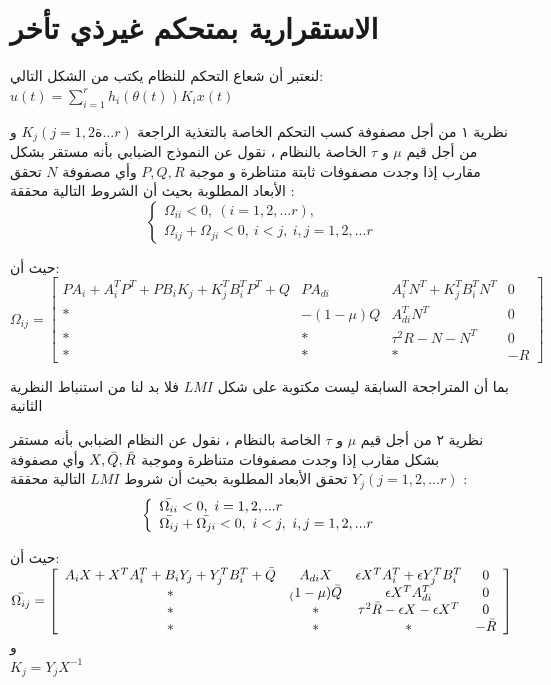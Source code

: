 \documentclass[dvipsnames,mathserif]{beamer}
\begin{document}
{\section{الاستقرارية بمتحكم غيرذي تأخر}
\begin{frame}
\footnotesize
لنعتبر أن شعاع التحكم للنظام يكتب من الشكل التالي:    $u(t)=\sum_{i=1}^{r} h_{i}(\theta(t))K_{i}x(t)$
\begin{block}{نظرية ١}
من أجل مصفوفة كسب التحكم الخاصة بالتغذية الراجعة  $K_{j}(j=1,2ة...r)$ و
من أجل قيم $\mu$ و $\tau$ الخاصة بالنظام  ، نقول عن النموذج  الضبابي بأنه مستقر بشكل مقارب  إذا وجدت مصفوفات ثابتة متناظرة و موجبة $P,Q,R$ وأي مصفوفة $N$ تحقق الأبعاد المطلوبة بحيث أن الشروط التالية محققة :
\begin{equation*}
\left\{\begin{array}{l}
{\Omega_{ii}}< 0,\   (i=1,2,...r) , \\
{\Omega_{ij}}+{\Omega_{ji}}<0,\ i<j ,\ i,j=1,2,...r
\end{array}\right.
\end{equation*}
\end{block}
حيث أن:
\tiny
\begin{equation*}
\Omega_{ij}= \left[\begin{array}{cccc}
PA_i+A_i^TP^T+PB_iK_j+K_j^TB_i^TP^T+Q& PA_{di}& A_i^TN^T+K_j^TB_i^TN^T & 0 \\ *& -(1-\mu)Q& A_{di}^TN^T & 0\\ *&*&\tau^2R-N-N^T & 0\\ * &* &* &-R 
   \end{array}\right]
\end{equation*}
\end{frame}
\begin{frame}
\footnotesize
بما أن المتراجحة السابقة ليست مكتوبة على شكل $LMI$
فلا بد لنا من استنباط النظرية الثانية 
\begin{block}{نظرية ٢}
من أجل قيم $\mu$ و $\tau$ الخاصة بالنظام ، نقول عن النظام  الضبابي  بأنه مستقر بشكل مقارب  إذا وجدت مصفوفات متناظرة وموجبة $X,\Bar{Q},\Bar{R}$ وأي مصفوفة $Y_j(j=1,2,...r)$ تحقق الأبعاد المطلوبة بحيث أن شروط $LMI$ التالية محققة :
\begin{equation*}
\left\{\begin{array}{l}
\Bar{\Omega_{ii}}< 0,\ i=1,2,...r \\
\Bar{\Omega_{ij}}+\Bar{\Omega_{ji}}<0,\ i<j , \ i,j=1,2,...r
\end{array}\right.
\end{equation*}
\end{block}
حيث أن:\\
$ \Bar{\Omega_{ij}}=\left[\begin{array}{cccc}
A_iX+X^TA_i^T+B_iY_j+Y_j^TB_i^T+\Bar{Q}& A_{di}X& \epsilon X^T A_i^T+\epsilon Y_j^TB_i^T & 0 \\ *& _(1-\mu)\Bar{Q}& \epsilon X^T A_{di}^T & 0\\ *&*&\tau^2\Bar{R}-\epsilon X-\epsilon X^T & 0\\ *&*&*&-\Bar{R}
   \end{array}\right]$
   و
   \\
   $K_j=Y_jX^{-1}$
\end{frame}
   
}
\end{document}
